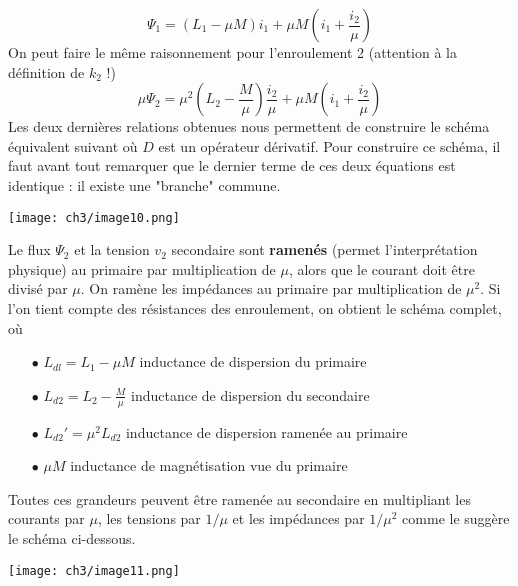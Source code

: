 		\begin{equation}
		\Psi_1=	\displaystyle (L_1-\mu M)i_1 + \mu M\left(i_1+\dfrac{i_2}{\mu}\right)
		\end{equation}
		On peut faire le même raisonnement pour l'enroulement 2 (attention à la 
		définition de $k_2$ !)
		\begin{equation}
		\mu\Psi_2 = \mu^2\left(L_2-\frac{M}{\mu}\right)\frac{i_2}{\mu} + \mu M\left(
		i_1+\frac{i_2}{\mu}\right)
		\end{equation}
		Les deux dernières relations obtenues nous permettent de construire le 
		schéma équivalent suivant où $D$ est un opérateur dérivatif. Pour 
		construire ce schéma, il faut avant tout remarquer que le dernier terme 
		de ces deux équations est identique : il existe une "branche" commune.
		\begin{center}
		\texttt{[image: ch3/image10.png]}
		\end{center}
		
		Le flux $\Psi_2$ et la tension $v_2$ secondaire sont \textbf{ramenés} (permet 
		l'interprétation physique) au primaire 
		par multiplication de $\mu$, alors que le courant doit être divisé par $
		\mu$. On ramène les impédances au primaire par multiplication de $\mu^2$.
		Si l'on tient compte des résistances des enroulement, on obtient le schéma 
		complet, où
		\begin{itemize}
		\item[$\bullet$] $L_{dl} = L_1-\mu M$ inductance de dispersion du primaire
		\item[$\bullet$] $L_{d2} = L_2-\frac{M}{\mu}$ inductance de dispersion du 
		secondaire
		\item[$\bullet$] $L_{d2}' = \mu^2L_{d2}$ inductance de dispersion ramenée au 
		primaire
		\item[$\bullet$] $\mu M$ inductance de magnétisation vue du primaire
		\end{itemize}
		Toutes ces grandeurs peuvent être ramenée au secondaire en multipliant les
		courants par $\mu$, les tensions par $1/\mu$ et les impédances par $1/\mu^2$ 
		comme le suggère le schéma ci-dessous.
		\begin{center}
		\texttt{[image: ch3/image11.png]}
		\end{center}
		
		
